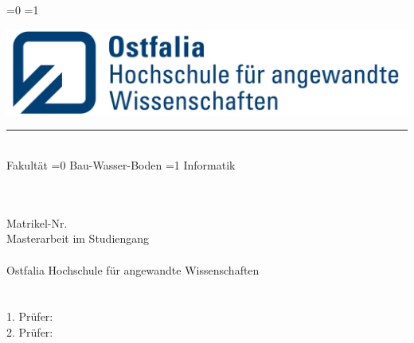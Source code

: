 
\begin{titlepage}
    
    \ifnum\value{documentfakultaet}=0
    \fi\ifnum\value{documentfakultaet}=1
    \fi
    
    \begin{flushleft}
    \includegraphics[scale=0.9]{Bilder/ostfalia_logo2.png}\\
    \color{strich} 
    \hspace{24mm}\rule{70mm}{0.25mm}\\
    \hspace{24mm}\Large
    \textsf{Fakultät
        \ifnum\value{documentfakultaet}=0
	    	Bau-Wasser-Boden
	    \fi\ifnum\value{documentfakultaet}=1
	    	Informatik
	    \fi
	}
    \end{flushleft}
    
    \begin{flushleft}
         \vspace{3em}
        {\color{text}\fontsize{21}{20}{\textsf{\documenttitle}}}\\
        \vspace{6em}
         {\large\textsf{\textbf{\documentname}}}\\
         {\small\textsf{Matrikel-Nr. \documentmanr}}\\
        \vspace{3em}
        {\color{black}\large\textsf{Masterarbeit im Studiengang \documentstudiengang\\
        \documentachievement
        \ \\
        Ostfalia Hochschule für angewandte Wissenschaften\\
        \color{strich}
        \hrulefill\\
        \ \\\color{black}
        1. Prüfer: \documentbetreuer
        \ \\
        2. Prüfer: \documentbetreuerzwei
        \ \\
        \ \\
        }}
        

\end{flushleft}
\end{titlepage}
